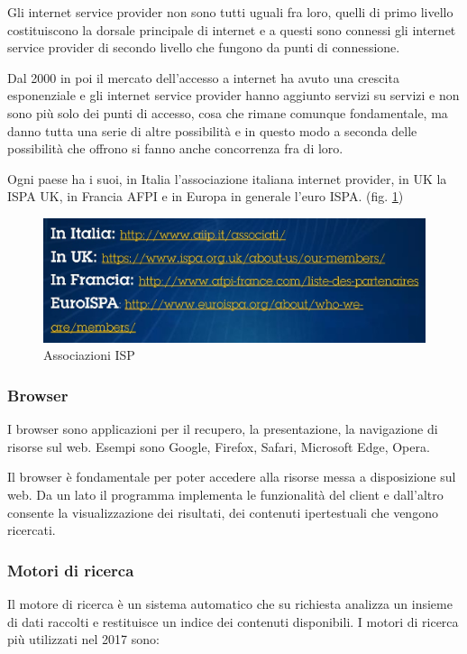 Gli internet service provider non sono tutti uguali fra loro, quelli di primo livello costituiscono la dorsale principale di internet e a questi sono connessi gli internet service provider di secondo livello che fungono da punti di connessione.

Dal 2000 in poi il mercato dell'accesso a internet ha avuto una crescita esponenziale e gli internet service provider hanno aggiunto servizi su servizi e non sono più solo dei punti di accesso, cosa che rimane comunque fondamentale, ma  danno tutta una serie di altre possibilità e in questo modo a seconda delle possibilità che offrono si fanno anche concorrenza fra di loro.

Ogni paese ha i suoi, in Italia l'associazione italiana internet provider, in UK la ISPA UK, in Francia AFPI e in Europa in generale l'euro ISPA. (fig. \ref{fig:Associazioni_ISP}) \par

\begin{figure}
    \centering
    \includegraphics[width=1\linewidth]{images/03_lez_fig_04.jpg}
    \caption{Associazioni ISP}
    \label{fig:Associazioni_ISP}
\end{figure}


\subsubsection{Browser}
I browser sono applicazioni per il recupero, la presentazione, la navigazione di risorse sul web. 
Esempi sono  Google, Firefox, Safari, Microsoft Edge, Opera.

Il browser è fondamentale per poter accedere alla risorse messa a disposizione sul web. Da un lato il programma implementa le funzionalità del client e dall'altro consente la visualizzazione dei risultati, dei contenuti ipertestuali che vengono ricercati.

\subsubsection{Motori di ricerca}
Il motore di ricerca è un sistema automatico che su richiesta analizza un insieme di dati raccolti e restituisce un indice dei contenuti disponibili. I motori di ricerca più utilizzati nel 2017 sono:

